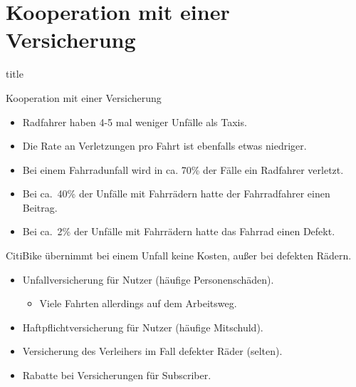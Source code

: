 \section{Kooperation mit einer Versicherung}

\begin{frame}
\begin{beamercolorbox}[sep=8pt,center]{title}
\end{beamercolorbox}
\end{frame}

\begin{frame}{Kooperation mit einer Versicherung}
{
\begin{itemize}
\item Radfahrer haben 4-5 mal weniger Unfälle als Taxis.
\item Die Rate an Verletzungen pro Fahrt ist ebenfalls etwas niedriger.
\item Bei einem Fahrradunfall wird in ca. 70\% der Fälle ein Radfahrer verletzt.
\item Bei ca.\ 40\% der Unfälle mit Fahrrädern hatte der Fahrradfahrer einen Beitrag.
\item Bei ca.\ 2\% der Unfälle mit Fahrrädern hatte das Fahrrad einen Defekt.
\end{itemize}
}
{
CitiBike übernimmt bei einem Unfall keine Kosten, außer bei defekten Rädern.
\begin{itemize}
\item Unfallversicherung für Nutzer (häufige Personenschäden).
\begin{itemize}
\item Viele Fahrten allerdings auf dem Arbeitsweg.
\end{itemize}
\item Haftpflichtversicherung für Nutzer (häufige Mitschuld).
\item Versicherung des Verleihers im Fall defekter Räder (selten).
\item Rabatte bei Versicherungen für Subscriber.
\end{itemize}
}

\end{frame}






